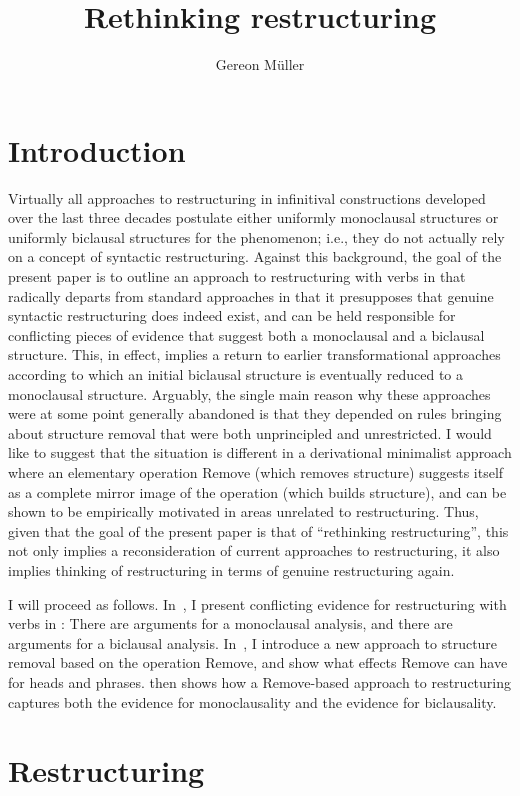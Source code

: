 \documentclass[output=paper]{langsci/langscibook}
\author{Gereon Müller\affiliation{Leipzig University}}
\title{Rethinking restructuring}
\begin{document}
\glsresetall

\section{Introduction}

Virtually all approaches to restructuring in infinitival constructions
developed over the last three decades postulate either uniformly monoclausal
structures or uniformly biclausal structures for the phenomenon; i.e., they do
not actually rely on a concept of syntactic restructuring. Against this
background, the goal of the present paper is to outline an approach to
restructuring with  verbs in  that radically departs from standard
approaches in that it presupposes that genuine syntactic restructuring does
indeed exist, and can be held responsible for conflicting pieces of evidence
that suggest both a monoclausal and a biclausal structure. This, in effect,
implies a return to earlier transformational approaches according to which an
initial biclausal structure is eventually reduced to a monoclausal structure.
Arguably, the single main reason why these approaches were at some point
generally abandoned is that they depended on  rules bringing about
structure removal that were both unprincipled and unrestricted. I would like to
suggest that the situation is different in a derivational minimalist approach
where an elementary operation Remove (which removes structure) suggests itself
as a complete mirror image of the operation  (which builds structure), and
can be shown to be empirically motivated in areas unrelated to restructuring.
Thus, given that the goal of the present paper is that of ``rethinking
restructuring'', this not only implies a reconsideration of current approaches
to restructuring, it also implies thinking of restructuring in terms of genuine
restructuring again.

I will proceed as follows. In~, I present conflicting evidence
for restructuring with  verbs in : There are arguments for a
monoclausal analysis, and there are arguments for a biclausal analysis.
In~, I introduce a new approach to structure removal based on
the operation Remove, and show what effects Remove can have for heads and
phrases.  then shows how a Remove-based approach to
restructuring captures both the evidence for monoclausality and the evidence
for biclausality.

\section{Restructuring}\label{sec:32.2}
\end{document}
